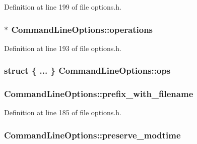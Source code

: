 Definition at line 199 of file options.\+h.

\subsubsection[{\texorpdfstring{operations}{operations}}]{$\ast$ Command\+Line\+Options\+::operations}\hypertarget{struct_command_line_options_ac5c5d0ac5cf0a565cfc8a1e9a8ccd520}{}\label{struct_command_line_options_ac5c5d0ac5cf0a565cfc8a1e9a8ccd520}


Definition at line 193 of file options.\+h.

\subsubsection[{\texorpdfstring{ops}{ops}}]{\setlength{\rightskip}{0pt plus 5cm}struct \{ ... \}   Command\+Line\+Options\+::ops}\hypertarget{struct_command_line_options_a268967d250a5e89586eaf4902dd35ea4}{}\label{struct_command_line_options_a268967d250a5e89586eaf4902dd35ea4}
\subsubsection[{\texorpdfstring{prefix\+\_\+with\+\_\+filename}{prefix_with_filename}}]{ Command\+Line\+Options\+::prefix\+\_\+with\+\_\+filename}\hypertarget{struct_command_line_options_a74e9c52811f32532f0b12dc4c639f8dd}{}\label{struct_command_line_options_a74e9c52811f32532f0b12dc4c639f8dd}


Definition at line 185 of file options.\+h.

\subsubsection[{\texorpdfstring{preserve\+\_\+modtime}{preserve_modtime}}]{ Command\+Line\+Options\+::preserve\+\_\+modtime}\hypertarget{struct_command_line_options_a525615f0b561d79e609223de5e940735}{}\label{struct_command_line_options_a525615f0b561d79e609223de5e940735}


